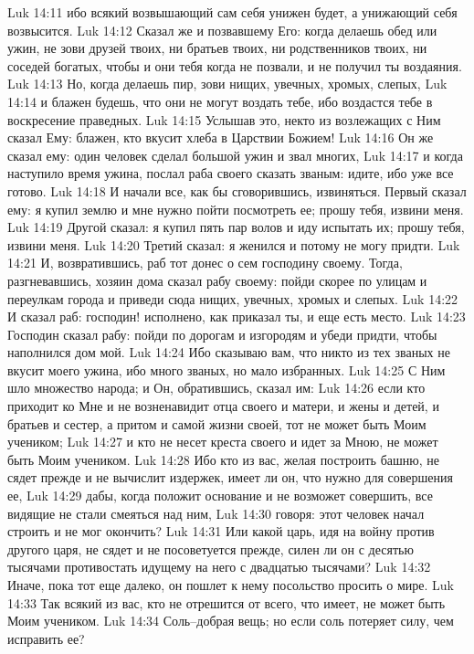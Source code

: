 Luk 14:11  ибо всякий возвышающий сам себя унижен будет, а унижающий себя возвысится.
Luk 14:12  Сказал же и позвавшему Его: когда делаешь обед или ужин, не зови друзей твоих, ни братьев твоих, ни родственников твоих, ни соседей богатых, чтобы и они тебя когда не позвали, и не получил ты воздаяния.
Luk 14:13  Но, когда делаешь пир, зови нищих, увечных, хромых, слепых,
Luk 14:14  и блажен будешь, что они не могут воздать тебе, ибо воздастся тебе в воскресение праведных.
Luk 14:15  Услышав это, некто из возлежащих с Ним сказал Ему: блажен, кто вкусит хлеба в Царствии Божием!
Luk 14:16  Он же сказал ему: один человек сделал большой ужин и звал многих,
Luk 14:17  и когда наступило время ужина, послал раба своего сказать званым: идите, ибо уже все готово.
Luk 14:18  И начали все, как бы сговорившись, извиняться. Первый сказал ему: я купил землю и мне нужно пойти посмотреть ее; прошу тебя, извини меня.
Luk 14:19  Другой сказал: я купил пять пар волов и иду испытать их; прошу тебя, извини меня.
Luk 14:20  Третий сказал: я женился и потому не могу придти.
Luk 14:21  И, возвратившись, раб тот донес о сем господину своему. Тогда, разгневавшись, хозяин дома сказал рабу своему: пойди скорее по улицам и переулкам города и приведи сюда нищих, увечных, хромых и слепых.
Luk 14:22  И сказал раб: господин! исполнено, как приказал ты, и еще есть место.
Luk 14:23  Господин сказал рабу: пойди по дорогам и изгородям и убеди придти, чтобы наполнился дом мой.
Luk 14:24  Ибо сказываю вам, что никто из тех званых не вкусит моего ужина, ибо много званых, но мало избранных.
Luk 14:25  С Ним шло множество народа; и Он, обратившись, сказал им:
Luk 14:26  если кто приходит ко Мне и не возненавидит отца своего и матери, и жены и детей, и братьев и сестер, а притом и самой жизни своей, тот не может быть Моим учеником;
Luk 14:27  и кто не несет креста своего и идет за Мною, не может быть Моим учеником.
Luk 14:28  Ибо кто из вас, желая построить башню, не сядет прежде и не вычислит издержек, имеет ли он, что нужно для совершения ее,
Luk 14:29  дабы, когда положит основание и не возможет совершить, все видящие не стали смеяться над ним,
Luk 14:30  говоря: этот человек начал строить и не мог окончить?
Luk 14:31  Или какой царь, идя на войну против другого царя, не сядет и не посоветуется прежде, силен ли он с десятью тысячами противостать идущему на него с двадцатью тысячами?
Luk 14:32  Иначе, пока тот еще далеко, он пошлет к нему посольство просить о мире.
Luk 14:33  Так всякий из вас, кто не отрешится от всего, что имеет, не может быть Моим учеником.
Luk 14:34  Соль--добрая вещь; но если соль потеряет силу, чем исправить ее?
